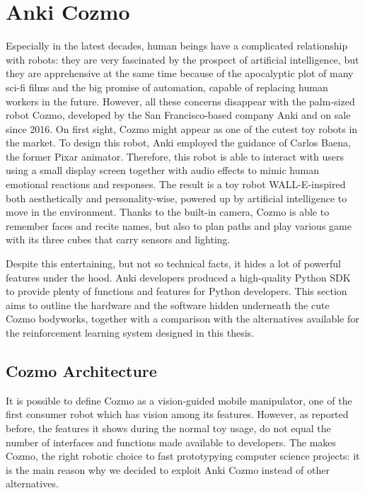 \section{Anki Cozmo}

Especially in the latest decades, human beings have a complicated relationship with robots: they are very fascinated by the prospect of artificial intelligence, but they are apprehensive at the same time because of the apocalyptic plot of many sci-fi films and the big promise of automation, capable of replacing human workers in the future.
However, all these concerns disappear with the palm-sized robot Cozmo, developed by the San Francisco-based company Anki and on sale since 2016.
On first sight, Cozmo might appear as one of the cutest toy robots in the market. To design this robot, Anki employed the guidance of Carlos Baena, the former Pixar animator. 
Therefore, this robot is able to interact with users using a small display screen together with audio effects to mimic human emotional reactions and responses.
The result is a toy robot WALL-E-inspired both aesthetically and personality-wise, powered up by artificial intelligence to move in the environment. Thanks to the built-in camera, Cozmo is able to remember faces and recite names, but also to plan paths and play various game with its three cubes that carry sensors and lighting.

Despite this entertaining, but not so technical facts, it hides a lot of powerful features under the hood. Anki developers produced a high-quality Python SDK to provide plenty of functions and features for Python developers. 
This section aims to outline the hardware and the software hidden underneath the cute Cozmo bodyworks, together with a comparison with the alternatives available for the reinforcement learning system designed in this thesis.

\subsection{Cozmo Architecture}

It is possible to define Cozmo as a vision-guided mobile manipulator, one of the first consumer robot which has vision among its features. However, as reported before, the features it shows during the normal toy usage, do not equal the number of interfaces and functions made available to developers. The makes Cozmo, the right robotic choice to fast prototypying computer science projects: it is the main reason why we decided to exploit Anki Cozmo instead of other alternatives.

